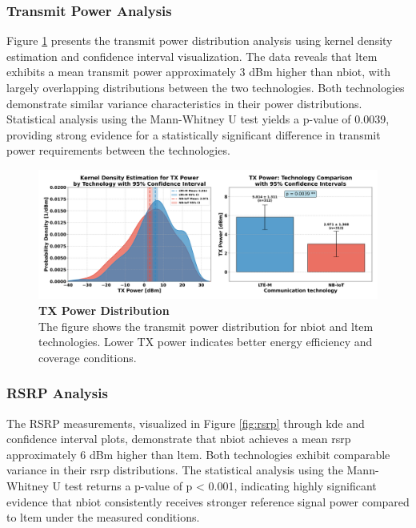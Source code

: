 \documentclass[12pt, english, openany]{book}
\begin{document}
\subsubsection*{Transmit Power Analysis} \label{sec:tx_power_analysis}

Figure \ref{fig:tx_power} presents the transmit power distribution analysis using kernel density estimation and confidence interval visualization. The data reveals that \gls{ltem} exhibits a mean transmit power approximately 3 dBm higher than \gls{nbiot}, with largely overlapping distributions between the two technologies. Both technologies demonstrate similar variance characteristics in their power distributions. Statistical analysis using the Mann-Whitney U test yields a p-value of 0.0039, providing strong evidence for a statistically significant difference in transmit power requirements between the technologies.

\begin{figure}[htbp]
    \centering
    \includegraphics[width=1.0\textwidth]{tx_power_kde_ci.png}
    \caption{\textbf{TX Power Distribution} \\ The figure shows the transmit power distribution for \gls{nbiot} and \gls{ltem} technologies. Lower TX power indicates better energy efficiency and coverage conditions.}
    \label{fig:tx_power}
\end{figure}
\FloatBarrier

\subsubsection*{RSRP Analysis} \label{sec:rsrp_analysis}

The RSRP measurements, visualized in Figure \ref{fig:rsrp} through \gls{kde} and confidence interval plots, demonstrate that \gls{nbiot} achieves a mean \gls{rsrp} approximately 6 dBm higher than \gls{ltem}. Both technologies exhibit comparable variance in their \gls{rsrp} distributions. The statistical analysis using the Mann-Whitney U test returns a p-value of p < 0.001, indicating highly significant evidence that \gls{nbiot} consistently receives stronger reference signal power compared to \gls{ltem} under the measured conditions.
\end{document}
